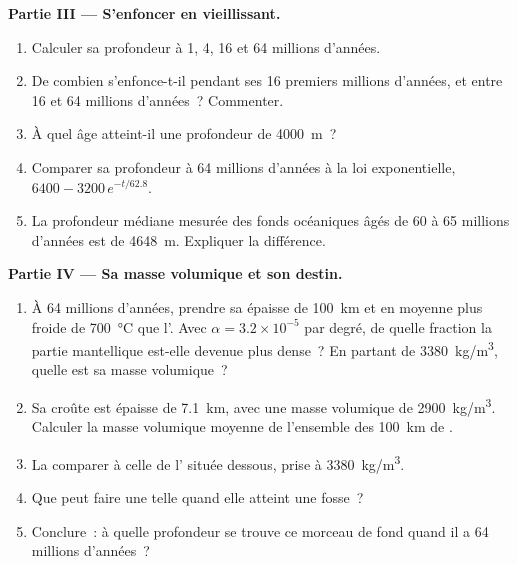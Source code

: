 \begin{problem}
\medskip
\noindent\textbf{Partie III --- S'enfoncer en vieillissant.}
\begin{enumerate}[resume]
  \item Calculer sa profondeur à 1, 4, 16 et 64 millions d'années.
  \item De combien s'enfonce-t-il pendant ses 16 premiers millions
        d'années, et entre 16 et 64 millions d'années~? Commenter.
  \item À quel âge atteint-il une profondeur de \qty{4000}{m}~?
  \item Comparer sa profondeur à 64 millions d'années à la loi
        exponentielle, $6400 - 3200\,e^{-t/62.8}$.
  \item La profondeur médiane mesurée des fonds océaniques âgés de 60 à
        65 millions d'années est de \qty{4648}{m}. Expliquer la différence.
\end{enumerate}

\medskip
\noindent\textbf{Partie IV --- Sa masse volumique et son destin.}
\begin{enumerate}[resume]
  \item À 64 millions d'années, prendre sa  épaisse de
        \qty{100}{km} et en moyenne plus froide de \qty{700}{\celsius} que
        l'. Avec $\alpha = 3.2 \times 10^{-5}$ par degré, de
        quelle fraction la partie mantellique est-elle devenue plus
        dense~? En partant de \qty{3380}{kg/m^3}, quelle est sa masse
        volumique~?
  \item Sa croûte est épaisse de \qty{7.1}{km}, avec une masse volumique de
        \qty{2900}{kg/m^3}. Calculer la masse volumique moyenne de
        l'ensemble des \qty{100}{km} de .
  \item La comparer à celle de l' située dessous, prise à
        \qty{3380}{kg/m^3}.
  \item Que peut faire une telle  quand elle atteint une
        fosse~?
  \item Conclure~: à quelle profondeur se trouve ce morceau de fond quand
        il a 64 millions d'années~?
\end{enumerate}
\end{problem}
